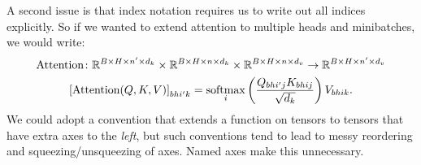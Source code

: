 A second issue is that index notation requires us to write out all indices explicitly. So if we wanted to extend attention to multiple heads and minibatches, we would write:
\begin{gather*}
  \text{Attention} \colon \mathbb{R}^{B \times H \times n' \times d_k} \times \mathbb{R}^{B \times H \times n \times d_k} \times \mathbb{R}^{B \times H \times n \times d_v} \rightarrow \mathbb{R}^{B \times H \times n' \times d_v} \\
  \left[\text{Attention}(Q, K, V)\right]_{bhi'k} = \operatorname*{softmax}_i \left( \frac{Q_{bhi'j} K_{bhij}}{\sqrt{d_k}} \right) V_{bhik}.
\end{gather*}
We could adopt a convention that extends a function on tensors to tensors that have extra axes to the \emph{left}, but such conventions tend to lead to messy reordering and squeezing/unsqueezing of axes. Named axes make this unnecessary.


